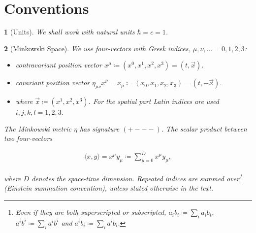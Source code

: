 \documentclass{article}
\theoremstyle{plain} %
\theoremstyle{convention} %
\newtheorem*{convention}{} %
\theoremstyle{remark} %
\numberwithin{equation}{section}
\begin{document}

\newpage

\section{Conventions}

\begin{convention}[Units]
We shall work with natural units $\hbar = c = 1$.
\end{convention}

\begin{convention}[Minkowski Space]
We use four-vectors with Greek indices, $\mu, \nu, \dots = 0, 1, 2, 3$:
\begin{itemize}
  \item contravariant position vector $x^{\mu} \coloneqq (x^0, x^1, x^2, x^3) = (t, \vec{x})$.
  \item covariant position vector $\eta_{\mu \nu} x^{\nu} = x_{\mu} \coloneqq (x_0, x_1, x_2, x_3) = (t, -\vec{x})$.
  \item where $\vec{x} \coloneqq (x^1, x^2, x^3)$. For the spatial part Latin indices are used $i,j,k,l = 1, 2, 3$.
\end{itemize}

The Minkowski metric $\eta$ has signature $(+---)$. The scalar product between two four-vectors

\begin{align*}
  \langle x, y \rangle = x^{\mu} y_{\mu} \coloneqq \sum_{\mu=0}^D x^{\mu} y_{\mu},
\end{align*}

where $D$ denotes the space-time dimension. Repeated indices are summed over\footnote{Even if they are both superscripted or subscripted, $a_i b_i \coloneqq \sum_i a_i b_i$, $a^i b^i \coloneqq \sum_i a^i b^i$ and $a^i b_i \coloneqq \sum_i a^i b_i$.} (Einstein summation convention), unless stated otherwise in the text.

\end{convention}
\end{document}
